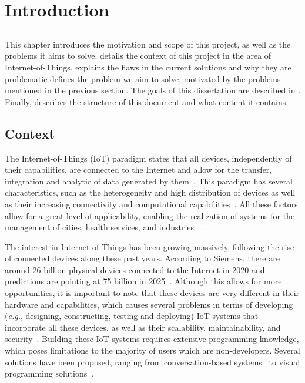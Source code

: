 \chapter{Introduction} \label{chap:intro}

\section*{}

\minitoc \mtcskip \noindent
This chapter introduces the motivation and scope of this project, as well as the problems it aims to solve.  details the context of this project in the area of Internet-of-Things.  explains the flaws in the current solutions and why they are problematic  defines the problem we aim to solve, motivated by the problems mentioned in the previous section. The goals of this dissertation are described in . Finally,  describes the structure of this document and what content it contains.

\section{Context} \label{sec:context}

The Internet-of-Things (IoT) paradigm states that all devices, independently of their capabilities, are connected to the Internet and allow for the transfer, integration and analytic of data generated by them~\cite{IoT_principles_and_paradigms}. This paradigm has several characteristics, such as the heterogeneity and high distribution of devices as well as their increasing connectivity and computational capabilities~\cite{SoS}. All these factors allow for a great level of applicability, enabling the realization of systems for the management of cities, health services, and industries ~\cite{6851114}.

The interest in Internet-of-Things has been growing massively, following the rise of connected devices along these past years. According to Siemens, there are around 26 billion physical devices connected to the Internet in 2020 and predictions are pointing at 75 billion in 2025~\cite{tanweer}. Although this allows for more opportunities, it is important to note that these devices are very different in their hardware and capabilities, which causes several problems in terms of developing (\emph{e.g.}, designing, constructing, testing and deploying) IoT systems that incorporate all these devices, as well as their scalability, maintainability, and security~\cite{SEDES2018,VVioT2018,europlop19}. Building these IoT systems requires extensive programming knowledge, which poses limitations to the majority of users which are non-developers. Several solutions have been proposed, ranging from conversation-based systems~\cite{ga20} to visual programming solutions~\cite{survey_vpl_iot}.

